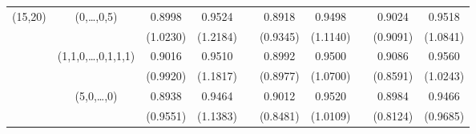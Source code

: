 \documentclass[12pt]{article}
\begin{document}
{\begin{center}
\begin{tabular}{cccccccccc}
(15,20) & (0,\dots,0,5)       & 0.8998  &  0.9524 && 0.8918  &  0.9498 && 0.9024  &  0.9518          \\
        &                     &(1.0230) & (1.2184)&&(0.9345) & (1.1140)&&(0.9091) & (1.0841) \\
        &(1,1,0,\dots,0,1,1,1)& 0.9016  &  0.9510 && 0.8992  &  0.9500 && 0.9086  &  0.9560          \\
        &                     &(0.9920) & (1.1817)&&(0.8977) & (1.0700)&&(0.8591) & (1.0243) \\
        & (5,0,\dots,0)       & 0.8938  &  0.9464 && 0.9012  &  0.9520 && 0.8984  &  0.9466                  \\
        &                     &(0.9551) & (1.1383)&&(0.8481) & (1.0109)&&(0.8124) & (0.9685) \\\hline
\end{tabular}
\end{center}}
\end{document}
